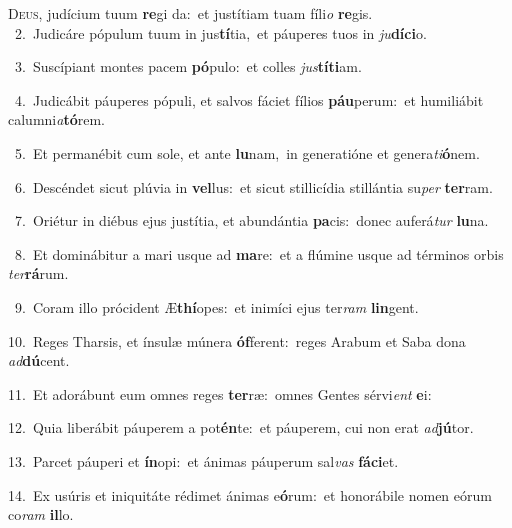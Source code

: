\lettrine{\initial\textcolor{\initialcolor}{D}}{eus,} judícium tuum \textbf{re}\-gi da:~\star et justítiam tuam fíli\textit{o} \textbf{re}\-gis.\\
{\numbfont\textcolor{\numbcolor}{~2.}}~Judicáre pópulum tuum in jus\-\textbf{tí}\-tia,~\star et páuperes tuos in \textit{ju}\-\textbf{dí}\textbf{ci}o.\par
{\numbfont\textcolor{\numbcolor}{~3.}}~Suscípiant montes pacem \textbf{pó}\-pulo:~\star et colles \textit{jus}\-\textbf{tí}\textbf{ti}am.\par
{\numbfont\textcolor{\numbcolor}{~4.}}~Judicábit páuperes pópuli, et salvos fáciet fílios \textbf{páu}\-perum:~\star et humiliábit calumni\-\textit{a}\-\textbf{tó}rem.\par
{\numbfont\textcolor{\numbcolor}{~5.}}~Et permanébit cum sole, et ante \textbf{lu}\-nam,~\star in generatióne et genera\-\textit{ti}\-\textbf{ó}nem.\par
{\numbfont\textcolor{\numbcolor}{~6.}}~Descéndet sicut plúvia in \textbf{vel}\-lus:~\star et sicut stillicídia stillántia su\textit{per} \textbf{ter}\-ram.\par
{\numbfont\textcolor{\numbcolor}{~7.}}~Oriétur in diébus ejus justítia, et abundántia \textbf{pa}\-cis:~\star donec auferá\textit{tur} \textbf{lu}\-na.\par
{\numbfont\textcolor{\numbcolor}{~8.}}~Et dominábitur a mari usque ad \textbf{ma}\-re:~\star et a flúmine usque ad términos orbis \textit{ter}\-\textbf{rá}rum.\par
{\numbfont\textcolor{\numbcolor}{~9.}}~Coram illo prócident Æ\-\textbf{thí}\-opes:~\star et inimíci ejus ter\textit{ram} \textbf{lin}\-gent.\par
{\numbfont\textcolor{\numbcolor}{10.}}~Reges Tharsis, et ínsulæ múnera \textbf{óf}\-ferent:~\star reges Arabum et Saba dona \textit{ad}\-\textbf{dú}cent.\par
{\numbfont\textcolor{\numbcolor}{11.}}~Et adorábunt eum omnes reges \textbf{ter}\-ræ:~\star omnes Gentes sérvi\textit{ent} \textbf{e}\-i:\par
{\numbfont\textcolor{\numbcolor}{12.}}~Quia liberábit páuperem a pot\-\textbf{én}\-te:~\star et páuperem, cui non erat \textit{ad}\-\textbf{jú}tor.\par
{\numbfont\textcolor{\numbcolor}{13.}}~Parcet páuperi et \textbf{ín}\-opi:~\star et ánimas páuperum sal\textit{vas} \textbf{fá}\-\textbf{ci}et.\par
{\numbfont\textcolor{\numbcolor}{14.}}~Ex usúris et iniquitáte rédimet ánimas e\-\textbf{ó}\-rum:~\star et honorábile nomen eórum co\textit{ram} \textbf{il}\-lo.\par
